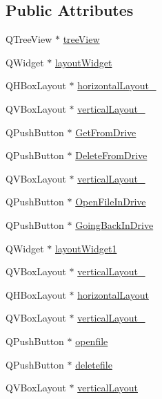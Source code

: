 \subsection*{Public Attributes}
\begin{DoxyCompactItemize}
\item 
Q\-Tree\-View $\ast$ \hyperlink{classUi__file_a67121b72f3e2194bf18485359ce6781d}{tree\-View}
\item 
Q\-Widget $\ast$ \hyperlink{classUi__file_a819bd4ef1c08655c8f3572af0d1404ac}{layout\-Widget}
\item 
Q\-H\-Box\-Layout $\ast$ \hyperlink{classUi__file_a28d8ab52b8dec9fcfe2ee693709d3f50}{horizontal\-Layout\-\_}
\item 
Q\-V\-Box\-Layout $\ast$ \hyperlink{classUi__file_a257693dbba46b1861288f832dc569ab7}{vertical\-Layout\-\_}
\item 
Q\-Push\-Button $\ast$ \hyperlink{classUi__file_ab9cd7b7de2b56d1f6d25b103eca0eba7}{Get\-From\-Drive}
\item 
Q\-Push\-Button $\ast$ \hyperlink{classUi__file_a9a10b6cb7393822676474186fa985c6e}{Delete\-From\-Drive}
\item 
Q\-V\-Box\-Layout $\ast$ \hyperlink{classUi__file_aa82c6b5bf1b9b6930783e40ed2b316db}{vertical\-Layout\-\_}
\item 
Q\-Push\-Button $\ast$ \hyperlink{classUi__file_a599eb136ecf51794cf50074ccfeec7af}{Open\-File\-In\-Drive}
\item 
Q\-Push\-Button $\ast$ \hyperlink{classUi__file_ab11f10d6d5de54a36404a7334c964ace}{Going\-Back\-In\-Drive}
\item 
Q\-Widget $\ast$ \hyperlink{classUi__file_a1be103a09e8bd7c925d0ae58bd0a523b}{layout\-Widget1}
\item 
Q\-V\-Box\-Layout $\ast$ \hyperlink{classUi__file_af41ed9af58e8d5bf56fb62fb9f35fe8c}{vertical\-Layout\-\_}
\item 
Q\-H\-Box\-Layout $\ast$ \hyperlink{classUi__file_a70e09d0902ee01b6516d029b77e5fc87}{horizontal\-Layout}
\item 
Q\-V\-Box\-Layout $\ast$ \hyperlink{classUi__file_af4fc003905e3e81c7d73c594b065ff41}{vertical\-Layout\-\_}
\item 
Q\-Push\-Button $\ast$ \hyperlink{classUi__file_a3ee6cbfb54093e3e4e691c35f996498d}{openfile}
\item 
Q\-Push\-Button $\ast$ \hyperlink{classUi__file_af1e176f2ca2f2e345cde798d43f50327}{deletefile}
\item 
Q\-V\-Box\-Layout $\ast$ \hyperlink{classUi__file_a3f498806df128db12bdc06e577950c07}{vertical\-Layout}

\end{DoxyCompactItemize}
